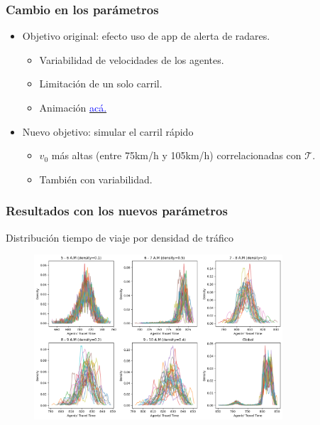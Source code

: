 \documentclass[10pt, compress]{beamer}
\begin{document}
\begin{frame}[fragile]
\frametitle{Cambio en los par\'ametros}

\begin{itemize}
\item Objetivo original: efecto uso de app de alerta de radares.
	\begin{itemize}
	\item Variabilidad de velocidades de los agentes.
	\item Limitaci\'on de un solo carril.
	\item Animaci\'on \href{https://youtu.be/NnljPUTmnGE}{\textcolor{blue}{ac\'a.}}
	\end{itemize}
\item Nuevo objetivo: simular el carril r\'apido
	\begin{itemize}
	\item $v_0$ m\'as altas (entre 75km/h y 105km/h) correlacionadas con $\mathcal{T}$.
	\item Tambi\'en con variabilidad.
	\end{itemize}
\end{itemize}

\end{frame}

\begin{frame}[fragile]
\frametitle{Resultados con los nuevos par\'ametros}

\centering
Distribuci\'on tiempo de viaje por densidad de tr\'afico

\begin{figure}
\centering
\includegraphics[width=25em]{images/travel_time_global.png}
\end{figure}


\end{frame}
\end{document}
